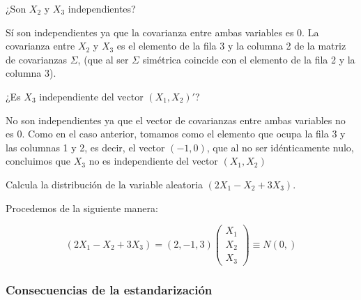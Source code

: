 \begin{example}
\ppart ¿Son $X_2$ y $X_3$ independientes?

Sí son independientes ya que la covarianza entre ambas variables es 0. La covarianza entre $X_2$ y $X_3$ es el elemento de la fila 3 y la columna 2 de la matriz de covarianzas $\Sigma$, (que al ser $\Sigma$ simétrica coincide con el elemento de la fila 2 y la columna 3).

\ppart ¿Es $X_3$ independiente del vector $(X_1, X_2)'$?

No son independientes ya que el vector de covarianzas entre ambas variables no es 0. Como en el caso anterior, tomamos como el elemento que ocupa la fila 3 y las columnas 1 y 2, es decir, el vector $(-1,0)$, que al no ser idénticamente nulo, concluimos que $X_3$ no es independiente del vector $(X_1,X_2)$


\ppart Calcula la  distribución de la variable aleatoria $(2X_1-X_2+3X_3)$.

Procedemos de la siguiente manera:

\[
(2X_1-X_2+3X_3)=(2,-1,3)\left(
\begin{array}{c}
X_1\\
X_2\\
X_3
\end{array}
\right)\equiv
N\left( 0,  \right)
\]

\end{example}

\subsubsection{Consecuencias de la estandarización}

